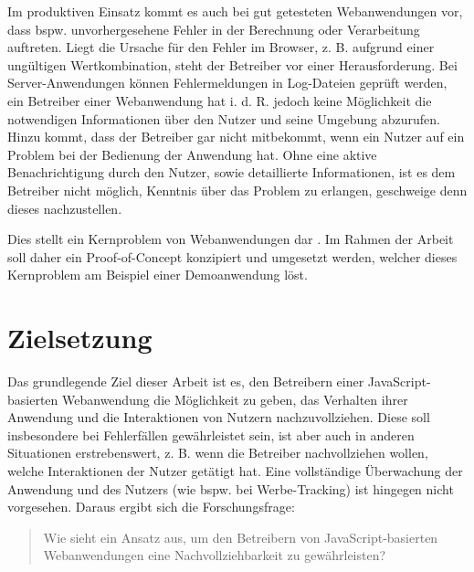 Im produktiven Einsatz kommt es auch bei gut getesteten Webanwendungen vor, dass bspw. unvorhergesehene Fehler in der Berechnung oder Verarbeitung auftreten. Liegt die Ursache für den Fehler im Browser, z. B. aufgrund einer ungültigen Wertkombination, steht der Betreiber vor einer Herausforderung. Bei Server-Anwendungen können Fehlermeldungen in Log-Dateien geprüft werden, ein Betreiber einer Webanwendung hat i. d. R. jedoch keine Möglichkeit die notwendigen Informationen über den Nutzer und seine Umgebung abzurufen. Hinzu kommt, dass der Betreiber gar nicht mitbekommt, wenn ein Nutzer auf ein Problem bei der Bedienung der Anwendung hat. Ohne eine aktive Benachrichtigung durch den Nutzer, sowie detaillierte Informationen, ist es dem Betreiber nicht möglich, Kenntnis über das Problem zu erlangen, geschweige denn dieses nachzustellen.

Dies stellt ein Kernproblem von Webanwendungen dar \cite{ClientSideMonitoringOfDistributedSystems}. Im Rahmen der Arbeit soll daher ein Proof-of-Concept konzipiert und umgesetzt werden, welcher dieses Kernproblem am Beispiel einer Demoanwendung löst.

\section{Zielsetzung}

Das grundlegende Ziel dieser Arbeit ist es, den Betreibern einer JavaScript-basierten Webanwendung die Möglichkeit zu geben, das Verhalten ihrer Anwendung und die Interaktionen von Nutzern nachzuvollziehen. Diese soll insbesondere bei Fehlerfällen gewährleistet sein, ist aber auch in anderen Situationen erstrebenswert, z. B. wenn die Betreiber nachvollziehen wollen, welche Interaktionen der Nutzer getätigt hat. Eine vollständige Überwachung der Anwendung und des Nutzers (wie bspw. bei Werbe-Tracking) ist hingegen nicht vorgesehen. Daraus ergibt sich die Forschungsfrage:

\begin{quotation}
	Wie sieht ein Ansatz aus, um den Betreibern von JavaScript-basierten Webanwendungen eine Nachvollziehbarkeit zu gewährleisten?
\end{quotation}

